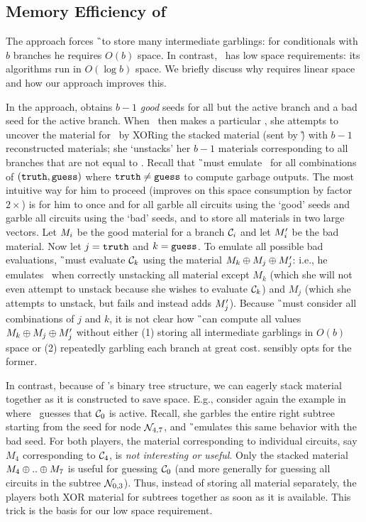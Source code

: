 \subsection{Memory Efficiency of \ourschemelong}
\label{sec:memoryEfficiency}

The \HK approach forces \G\ to store many intermediate
garblings: for conditionals with $b$ branches he requires $O(b)$ space.
In contrast, \ourschemelong\ has low space requirements: its
algorithms run in $O(\log b)$ space.
%
We briefly discuss why \HK requires linear space and how our approach
improves this.

In the \HK approach, \E obtains $b-1$ \emph{good} seeds for all but the
active branch and a bad seed for the active branch.
%
When \E\ then makes a particular \guess, she attempts to uncover the
material for \guess\ by XORing the stacked material (sent by \G) with
$b-1$ reconstructed materials; she `unstacks' her $b-1$ materials
corresponding to all branches that are not equal to \guess.
%
Recall that \G\ must emulate \E\ for all combinations of $(\mathtt{truth},
\mathtt{guess})$ where $\mathtt{truth} \neq \mathtt{guess}$ to compute garbage outputs.
%
The most intuitive way for him to proceed (\HK improves on this space
consumption by factor $2\times$) is for him to once and for all garble all circuits using the `good'
seeds and garble all circuits using the `bad' seeds, and to
store all materials in two large vectors.
Let $M_i$ be the good material for a branch $\mathcal C_i$ and let $M'_i$ be
the bad material.
%
Now let $j = \mathtt{truth}$ and $k = \mathtt{guess}$.
To emulate all possible bad evaluations, \G\ must evaluate $\mathcal C_k$
using the material $M_k \oplus M_j \oplus M_j'$:
i.e., he emulates \E\ when correctly unstacking all material except $M_k$
(which she will not even attempt to unstack because she wishes to
evaluate $\mathcal C_k$) and $M_j$ (which she attempts to unstack, but fails
and instead adds $M_j'$).
%
Because \G\ must consider all combinations of $j$ and $k$, it is not
clear how \G\ can compute all values $M_k \oplus M_j \oplus
M_j'$ without either (1) storing all intermediate garblings in
$O(b)$ space or (2) repeatedly garbling each branch at great cost.
\HK sensibly opts for the former.

In contrast, because of \ourschemelong's binary tree
structure, we can eagerly stack material together as it is constructed
to save space.
%
E.g., consider again the example in  where
\E\ guesses that $\mathcal C_0$ is active.
%
Recall, she garbles the entire right subtree starting from the
seed for node $\mathtt{\cal N}_{4, 7}$, and \G\ emulates this same behavior with
the bad seed.
%
For both players, the material corresponding to individual circuits, say
$M_4$ corresponding to $\mathcal C_4$, is \emph{not interesting or useful}.
Only the stacked material $M_4 \oplus .. \oplus M_7$ is useful for
guessing $\mathcal C_0$ (and more generally for guessing all circuits in the subtree
$\mathtt{\cal N}_{0, 3}$).
Thus, instead of storing all material separately, the players both XOR
material for subtrees together as soon as it is available.
This trick is the basis for our low space requirement.


